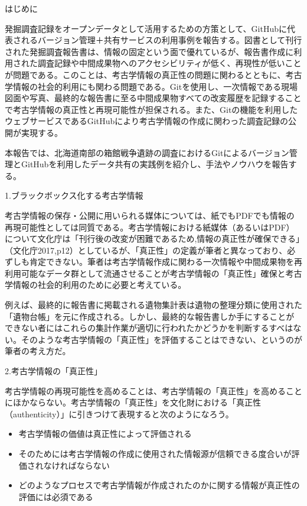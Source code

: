 \documentclass[9pt,b5j,papersize]{jsarticle}
\begin{document}
\begin{multicols}{2}

\noindent
{\large はじめに}

発掘調査記録をオープンデータとして活用するための方策として、GitHubに代表されるバージョン管理＋共有サービスの利用事例を報告する。図書として刊行された発掘調査報告書は、情報の固定という面で優れているが、報告書作成に利用された調査記録や中間成果物へのアクセシビリティが低く、再現性が低いことが問題である。このことは、考古学情報の真正性の問題に関わるとともに、考古学情報の社会的利用にも関わる問題である。Gitを使用し、一次情報である現場図面や写真、最終的な報告書に至る中間成果物すべての改変履歴を記録することで考古学情報の真正性と再現可能性が担保される。また、Gitの機能を利用したウェブサービスであるGitHubにより考古学情報の作成に関わった調査記録の公開が実現する。

本報告では、北海道南部の箱館戦争遺跡の調査におけるGitによるバージョン管理とGitHubを利用したデータ共有の実践例を紹介し、手法やノウハウを報告する。

\noindent
{\large 1.ブラックボックス化する考古学情報}

考古学情報の保存・公開に用いられる媒体については、紙でもPDFでも情報の再現可能性としては同質である。考古学情報における紙媒体（あるいはPDF）について文化庁は「刊行後の改変が困難であるため,情報の真正性が確保できる」（文化庁2017,p12）としているが、「真正性」の定義が筆者と異なっており、必ずしも肯定できない。筆者は考古学情報作成に関わる一次情報や中間成果物を再利用可能なデータ群として流通させることが考古学情報の「真正性」確保と考古学情報の社会的利用のために必要と考えている。

例えば、最終的に報告書に掲載される遺物集計表は遺物の整理分類に使用された「遺物台帳」を元に作成される。しかし、最終的な報告書しか手にすることができない者にはこれらの集計作業が適切に行われたかどうかを判断するすべはない。そのような考古学情報の「真正性」を評価することはできない、というのが筆者の考え方だ。

\noindent
{\large 2.考古学情報の「真正性」}

考古学情報の再現可能性を高めることは、考古学情報の「真正性」を高めることにほかならない。考古学情報の「真正性」を文化財における「真正性（authenticity）」に引きつけて表現すると次のようになろう。

\begin{itemize}
\item 考古学情報の価値は真正性によって評価される
\item そのためには考古学情報の作成に使用された情報源が信頼できる度合いが評価されなければならない
\item どのようなプロセスで考古学情報が作成されたのかに関する情報が真正性の評価には必須である
\end{itemize}


\end{multicols}
\end{document}
